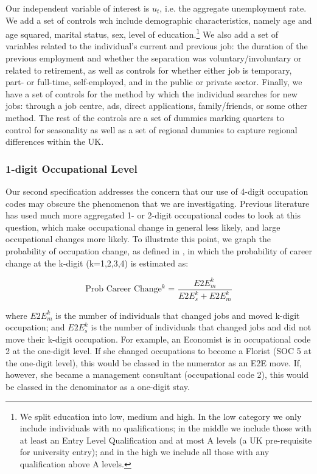 \documentclass[11pt, oneside]{article}
\begin{document}
Our independent variable of interest is $u_{t}$, i.e. the aggregate unemployment rate. We add a set of controls wch include demographic characteristics, namely age and age squared, marital status, sex, level of education.\footnote{We split education into low, medium and high. In the low category we only include individuals with no qualifications; in the middle we include those with at least an Entry Level Qualification and at most A levels (a UK pre-requisite for university entry); and in the high we include all those with any qualification above A levels.} We also add a set of variables related to the individual's current and previous job: the duration of the previous employment and whether the separation was voluntary/involuntary or related to retirement, as well as controls for whether either job is temporary, part- or full-time, self-employed, and in the public or private sector. Finally, we have a set of controls for the method by which the individual searches for new jobs: through a job centre, ads, direct applications, family/friends, or some other method. The rest of the controls are a set of dummies marking quarters to control for seasonality as well as a set of regional dummies to capture regional differences within the UK.

\subsubsection{1-digit Occupational Level}
\label{sec:1digit}

Our second specification addresses the concern that our use of 4-digit occupation codes may obscure the phenomenon that we are investigating. Previous literature has used much more aggregated 1- or 2-digit occupational codes to look at this question, which make occupational change in general less likely, and large occupational changes more likely. To illustrate this point, we graph the probability of occupation change, as defined in \cite{Carrillo-Tudela2016}, in which the probability of career change at the k-digit (k=1,2,3,4) is estimated as:

\begin{equation*}
\text{Prob Career Change$^{k}$ = } \frac{E2E^{k}_m}{E2E^{k}_s + E2E^{k}_m}
\end{equation*}

\noindent where $E2E^{k}_m$ is the number of individuals that changed jobs and moved k-digit occupation; and $E2E^{k}_s$ is the number of individuals that changed jobs and did not move their k-digit occupation. For example, an Economist is in occupational code 2 at the one-digit level. If she changed occupations to become a Florist (SOC 5 at the one-digit level), this would be classed in the numerator as an E2E move. If, however, she became a management consultant (occupational code 2), this would be classed in the denominator as a one-digit stay.
\end{document}
